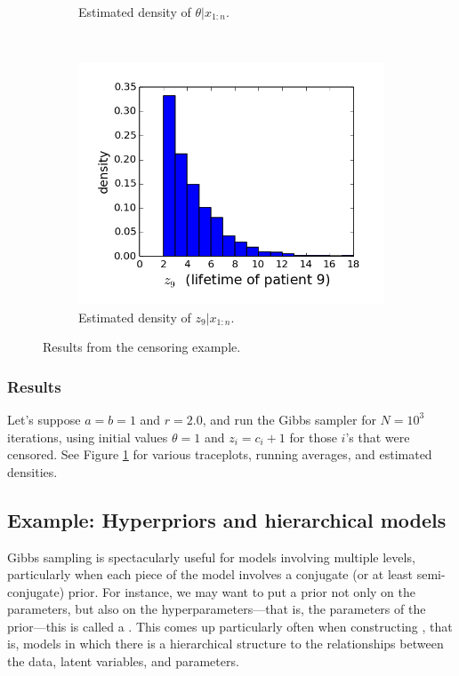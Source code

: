 \documentclass[12pt]{article}
\begin{document}
\begin{figure}
\begin{subfigure}[t]{0.49\textwidth}
        \caption{Estimated density of $\theta|x_{1:n}$.}
    \end{subfigure}%
    ~ 
    \begin{subfigure}[t]{0.49\textwidth}
        \centering
        \includegraphics[trim=0 0.6cm 0 0, clip, width=1\textwidth]{censored-z_density.png}
        \caption{Estimated density of $z_9|x_{1:n}$.}
    \end{subfigure}
    \vspace{.5em}
    \caption{Results from the censoring example.}
    \label{figure:censored}
\end{figure}

\subsubsection{Results}

Let's suppose $a = b = 1$ and $r = 2.0$, and run the Gibbs sampler for $N = 10^3$ iterations, using initial values $\theta = 1$ and $z_i = c_i+1$ for those $i$'s that were censored.
See Figure \ref{figure:censored} for various traceplots, running averages, and estimated densities.




\subsection{Example: Hyperpriors and hierarchical models}

Gibbs sampling is spectacularly useful for models involving multiple levels, particularly when each piece of the model involves a conjugate (or at least semi-conjugate) prior. For instance, we may want to put a prior not only on the parameters, but also on the hyperparameters---that is, the parameters of the prior---this is called a . This comes up particularly often when constructing , that is, models in which there is a hierarchical structure to the relationships between the data, latent variables, and parameters.
\end{document}
